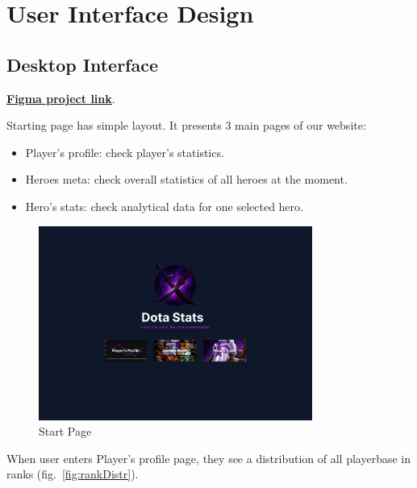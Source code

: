 \section{User Interface Design}

    \subsection{Desktop Interface}

    \href{https://www.figma.com/design/ZMtwuBt3jj4DOkPbbY6ElO/dota-stats?node-id=0-1&t=I0Mi3I4WJnfS4DOc-1}{\textbf{Figma project link}}.

    \vspace{1em}
    Starting page has simple layout.
    It presents 3 main pages of our website:
    \begin{itemize}
        \item Player's profile: check player's statistics.
        \item Heroes meta: check overall statistics of all heroes at the moment.
        \item Hero's stats: check analytical data for one selected hero.
    \end{itemize}


    \begin{figure}[ht]
        \centering
        \includegraphics[width=0.8\textwidth]{images/Start}
        \caption{Start Page}
    \end{figure}

    When user enters Player's profile page, they see a distribution of all playerbase in ranks (fig.~\ref{fig:rankDistr}).

